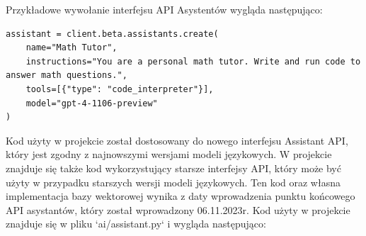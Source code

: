 \begin{enumerate}
        Przykładowe wywołanie interfejsu API Asystentów wygląda następująco:
        \begin{listing}
            \begin{verbatim}
assistant = client.beta.assistants.create(
    name="Math Tutor",
    instructions="You are a personal math tutor. Write and run code to answer math questions.",
    tools=[{"type": "code_interpreter"}],
    model="gpt-4-1106-preview"
)
            \end{verbatim}
        \end{listing}
\end{enumerate}

Kod użyty w projekcie został dostosowany do nowego interfejsu Assistant API, który jest zgodny z najnowszymi wersjami modeli językowych. W projekcie znajduje się także kod wykorzystujący starsze interfejsy API, który może być użyty w przypadku starszych wersji modeli językowych. Ten kod oraz własna implementacja bazy wektorowej wynika z daty wprowadzenia punktu końcowego API asystantów, który został wprowadzony 06.11.2023r.
Kod użyty w projekcie znajduje się w pliku `ai/assistant.py` i wygląda następująco:

